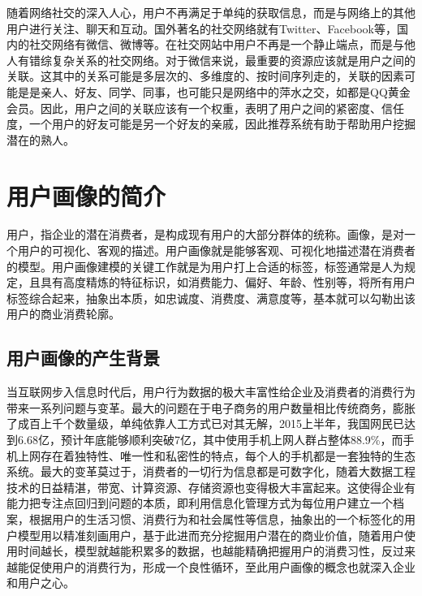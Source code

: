 	随着网络社交的深入人心，用户不再满足于单纯的获取信息，而是与网络上的其他用户进行关注、聊天和互动。国外著名的社交网络就有Twitter、Facebook等，国内的社交网络有微信、微博等。在社交网站中用户不再是一个静止端点，而是与他人有错综复杂关系的社交网络。对于微信来说，最重要的资源应该就是用户之间的关联。这其中的关系可能是多层次的、多维度的、按时间序列走的，关联的因素可能是是亲人、好友、同学、同事，也可能只是网络中的萍水之交，如都是QQ黄金会员。因此，用户之间的关联应该有一个权重，表明了用户之间的紧密度、信任度，一个用户的好友可能是另一个好友的亲戚，因此推荐系统有助于帮助用户挖掘潜在的熟人。

\section{用户画像的简介}
	用户，指企业的潜在消费者，是构成现有用户的大部分群体的统称。画像，是对一个用户的可视化、客观的描述。用户画像就是能够客观、可视化地描述潜在消费者的模型。用户画像建模的关键工作就是为用户打上合适的标签，标签通常是人为规定，且具有高度精炼的特征标识，如消费能力、偏好、年龄、性别等，将所有用户标签综合起来，抽象出本质，如忠诚度、消费度、满意度等，基本就可以勾勒出该用户的商业消费轮廓。
	\subsection{用户画像的产生背景}
	当互联网步入信息时代后，用户行为数据的极大丰富性给企业及消费者的消费行为带来一系列问题与变革。最大的问题在于电子商务的用户数量相比传统商务，膨胀了成百上千个数量级，单纯依靠人工方式已对其无解，2015上半年，我国网民已达到6.68亿，预计年底能够顺利突破7亿，其中使用手机上网人群占整体88.9\%，而手机上网存在着独特性、唯一性和私密性的特点，每个人的手机都是一套独特的生态系统。最大的变革莫过于，消费者的一切行为信息都是可数字化，随着大数据工程技术的日益精湛，带宽、计算资源、存储资源也变得极大丰富起来。这使得企业有能力把专注点回归到问题的本质，即利用信息化管理方式为每位用户建立一个档案，根据用户的生活习惯、消费行为和社会属性等信息，抽象出的一个标签化的用户模型用以精准刻画用户，基于此进而充分挖掘用户潜在的商业价值，随着用户使用时间越长，模型就越能积累多的数据，也越能精确把握用户的消费习性，反过来越能促使用户的消费行为，形成一个良性循环，至此用户画像的概念也就深入企业和用户之心。

